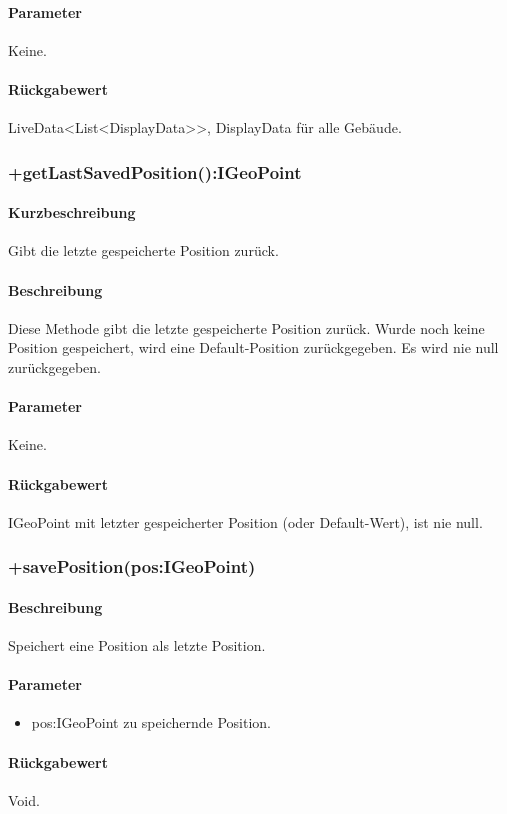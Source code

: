 \paragraph*{Parameter}
Keine.
\paragraph*{Rückgabewert}
LiveData<List<DisplayData>>, DisplayData für alle Gebäude.

\subsubsection{+getLastSavedPosition():IGeoPoint}%
\paragraph*{Kurzbeschreibung}
Gibt die letzte gespeicherte Position zurück.
\paragraph*{Beschreibung}
Diese Methode gibt die letzte gespeicherte Position zurück. Wurde noch keine Position gespeichert,
wird eine Default-Position zurückgegeben. Es wird nie null zurückgegeben.
\paragraph*{Parameter}
Keine.
\paragraph*{Rückgabewert}
IGeoPoint mit letzter gespeicherter Position (oder Default-Wert), ist nie null.

\subsubsection{+savePosition(pos:IGeoPoint)}%
\paragraph*{Beschreibung}
Speichert eine Position als letzte Position.
\paragraph*{Parameter}
\begin{itemize}
    \item pos:IGeoPoint zu speichernde Position.
\end{itemize}
\paragraph*{Rückgabewert}
Void.
